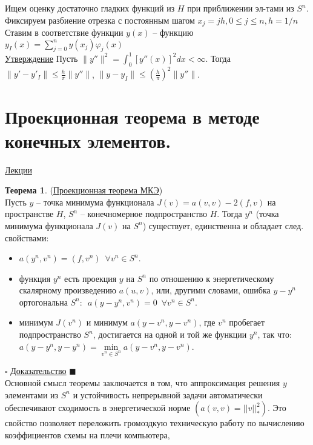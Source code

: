 \documentclass[specialist, subf, href, colorlinks=true, 12pt, times, mtpro, final]{disser}
\theoremstyle{definition}
\newtheorem{theorem}{Теорема}[section]
\begin{document}
{    Ищем оценку достаточно гладких функций из $H$ при приближении эл-тами из $S^n$. \\
    Фиксируем разбиение отрезка с постоянным шагом $x_j = jh, 0 \leq j \leq n, h = 1/n$\\
    Ставим в соответствие функции $y(x)$ \---
    функцию $ y_I (x) = \sum\limits^n_{j=0} y(x_j)\varphi_j(x)$\\
    
    \hyperlink {lects.102}{Утверждение}  Пусть $\|y''\|^2 = \int^1_0 [y''(x)]^2dx < \infty$. Тогда
    $\|y' - y'_I\| \leq \frac{h}{\pi}\|y''\|$,  $\|y-y_I\| \leq (\frac{h}{\pi})^2\|y''\|$.

\section {Проекционная теорема в методе конечных элементов.}
    \hyperlink {lects.103}{Лекции}
    \begin{theorem} (\hyperlink {lects.103}{Проекционная теорема МКЭ})\\
    Пусть $y$ -- точка минимума функционала $J(v) = a(v,v) - 2(f,v)$ на пространстве
    $H$, $S^n$ -- конечномерное подпространство $H$. Тогда $y^n$ (точка минимума
    функционала $J(v)$ на $S^n$) существует, единственна и обладает след. свойствами:
    \begin{itemize}
    \item $a(y^n,v^n) = (f,v^n)\,\,\, \forall v^n \in S^n$.
    \item функция $y^n$ есть проекция $y$ на $S^n$ по отношению к энергетическому скалярному
    произведению $a(u,v)$, или, другими словами, ошибка $y-y^n$ ортогональна $S^n$:\,\,
    $a(y-y^n,v^n) = 0 \,\,\, \forall v^n \in S^n$.
    \item минимум $J(v^n)$ и минимум $a(y-v^n, y-v^n)$, где $v^n$ пробегает подпространство
    $S^n$, достигается на одной и той же функции $y^n$, так что:
    $a(y-y^n,y-y^n) = \min\limits_{v^n\in S^n} a(y-v^n,y-v^n)$.
    \end{itemize}
    \end{theorem}
    \noindent$\square$ \hyperlink {lects.104}{Доказательство} $\blacksquare$\\
    Основной смысл теоремы заключается в том, что аппроксимация решения $y$ элементами
    из $S^n$ и устойчивость непрерывной задачи автоматически обеспечивают сходимость в
    энергетической норме $(a(v,v) = ||v||_*^2)$. Это свойство позволяет переложить
    громоздкую техническую работу по вычислению коэффициентов схемы на плечи компьютера,
}
\end{document}
